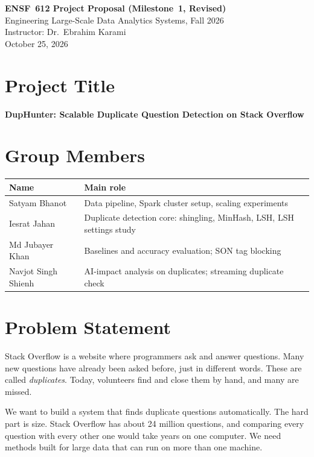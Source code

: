 \documentclass[11pt,a4paper]{article}
\begin{document}
\begin{center}
  {\Large\bfseries ENSF~612 Project Proposal (Milestone~1, Revised)}\\[3pt]
  {\small Engineering Large-Scale Data Analytics Systems, Fall 2026\\[1pt]
  Instructor: Dr.~Ebrahim Karami\\[1pt]
  October 25, 2026}
\end{center}

\section{Project Title}
\textbf{DupHunter: Scalable Duplicate Question Detection on Stack Overflow}

\section{Group Members}
{\small
\begin{tabularx}{\textwidth}{@{}l Y@{}}
\toprule
\textbf{Name} & \textbf{Main role} \\
\midrule
Satyam Bhanot & Data pipeline, Spark cluster setup, scaling experiments \\
Iesrat Jahan & Duplicate detection core: shingling, MinHash, LSH, LSH settings study \\
Md Jubayer Khan & Baselines and accuracy evaluation; SON tag blocking \\
Navjot Singh Shienh & AI-impact analysis on duplicates; streaming duplicate check \\
\bottomrule
\end{tabularx}}

\section{Problem Statement}

Stack Overflow is a website where programmers ask and answer questions. Many
new questions have already been asked before, just in different words. These
are called \emph{duplicates}. Today, volunteers find and close them by hand,
and many are missed.

We want to build a system that finds duplicate questions automatically. The
hard part is size. Stack Overflow has about 24 million questions, and comparing
every question with every other one would take years on one computer. We need
methods built for large data that can run on more than one machine.
\end{document}
